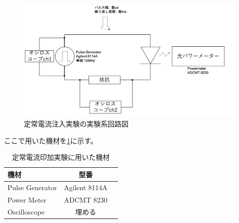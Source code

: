 \begin{figure}[htbp]
	\includegraphics[width=15cm]{figure/fig_2_2_IL_setup.png}
	\caption{定常電流注入実験の実験系回路図}
	\label{fig:fig_2_2_IL_setup}
\end{figure}
\clearpage
ここで用いた機材を\ref{table:table_2_2_IL_setup}に示す。
\begin{table}[hbtp]
  \caption{定常電流印加実験に用いた機材}
  \label{table:table_2_2_IL_setup}
  \centering
  \begin{tabular}{lcr}
    \hline
    機材  & 型番     \\
    \hline \hline
    Pulse Generator  & Agilent 8114A   \\
    Power Meter  &  ADCMT 8230    \\
    Oscilloscope  &  埋める  \\
       \hline
  \end{tabular}
\end{table}
 \clearpage
